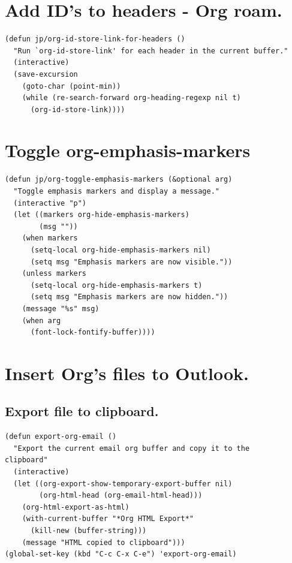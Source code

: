 \documentclass[11pt]{article}
\begin{document}
\section{Add ID's to headers - Org roam.}
\label{sec:orgf2fa6d4}
\begin{verbatim}
(defun jp/org-id-store-link-for-headers ()
  "Run `org-id-store-link' for each header in the current buffer."
  (interactive)
  (save-excursion
    (goto-char (point-min))
    (while (re-search-forward org-heading-regexp nil t)
      (org-id-store-link))))
\end{verbatim}
\section{Toggle org-emphasis-markers}
\label{sec:orgdc8dec8}
\begin{verbatim}
(defun jp/org-toggle-emphasis-markers (&optional arg)
  "Toggle emphasis markers and display a message."
  (interactive "p")
  (let ((markers org-hide-emphasis-markers)
        (msg ""))
    (when markers
      (setq-local org-hide-emphasis-markers nil)
      (setq msg "Emphasis markers are now visible."))
    (unless markers
      (setq-local org-hide-emphasis-markers t)
      (setq msg "Emphasis markers are now hidden."))
    (message "%s" msg)
    (when arg
      (font-lock-fontify-buffer))))
\end{verbatim}
\section{Insert Org's files to Outlook.}
\label{sec:org8bf0241}
\subsection{Export file to clipboard.}
\label{sec:orgc140211}
\begin{verbatim}
(defun export-org-email ()
  "Export the current email org buffer and copy it to the
clipboard"
  (interactive)
  (let ((org-export-show-temporary-export-buffer nil)
        (org-html-head (org-email-html-head)))
    (org-html-export-as-html)
    (with-current-buffer "*Org HTML Export*"
      (kill-new (buffer-string)))
    (message "HTML copied to clipboard")))
(global-set-key (kbd "C-c C-x C-e") 'export-org-email)
\end{verbatim}
\end{document}
